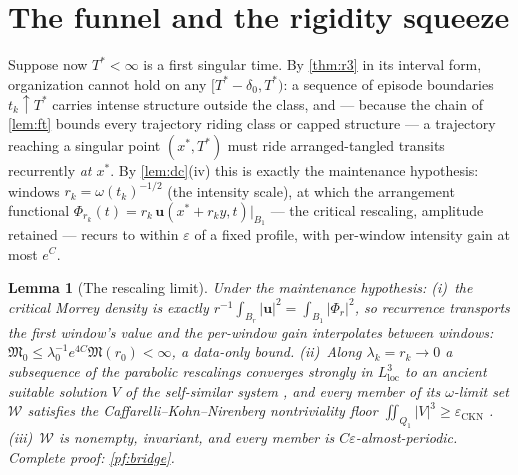 \documentclass[11pt,letterpaper]{amsart}
\newtheorem{lemma}[theorem]{Lemma}
\theoremstyle{definition}
\theoremstyle{remark}
\newcommand{\om}{\omega}
\newcommand{\uu}{\boldsymbol{u}}
\newcommand{\abs}[1]{\lvert #1 \rvert}
\begin{document}
\section{The funnel and the rigidity squeeze}\label{sec:funnel}

Suppose now $T^*<\infty$ is a first singular time. By \cref{thm:r3} in its interval
form, organization cannot hold on any $[T^*-\delta_0,T^*)$: a sequence of episode
boundaries $t_k\uparrow T^*$ carries intense structure outside the class, and ---
because the chain of \cref{lem:ft} bounds every trajectory riding class or capped
structure --- a trajectory reaching a singular point $(x^*,T^*)$ must ride
arranged-tangled transits recurrently \emph{at $x^*$}. By
\cref{lem:dc}\textup{(iv)} this is exactly the maintenance hypothesis: windows
$r_k=\om(t_k)^{-1/2}$ (the intensity scale), at which the arrangement functional
$\Phi_{r_k}(t)=r_k\,\uu(x^*+r_ky,t)|_{B_1}$ --- the critical rescaling, amplitude
retained --- recurs to within $\varepsilon$ of a fixed profile, with per-window
intensity gain at most $e^C$.

\begin{lemma}[The rescaling limit]\label{lem:bridge}
Under the maintenance hypothesis: \textup{(i)}~the critical Morrey density is exactly
$r^{-1}\int_{B_r}\abs{\uu}^2=\int_{B_1}\abs{\Phi_r}^2$, so recurrence transports the
first window's value and the per-window gain interpolates between windows:
$\mathfrak{M}_0\le\lambda_0^{-1}e^{4C}\mathfrak{M}(r_0)<\infty$, a data-only bound.
\textup{(ii)}~Along $\lambda_k=r_k\to0$ a subsequence of the parabolic rescalings
converges strongly in $L^3_{\mathrm{loc}}$ to an ancient suitable solution $V$ of the
self-similar system \cite{CKN1982,LemarieRieusset2002,KikuchiSeregin2007,Lin1998},
and every member of its $\om$-limit set $\mathcal{W}$ satisfies the
Caffarelli--Kohn--Nirenberg nontriviality floor
$\iint_{Q_1}\abs{V}^3\ge\varepsilon_{\mathrm{CKN}}$ \cite{CKN1982,Lin1998}.
\textup{(iii)}~$\mathcal{W}$ is nonempty, invariant, and every member is
$C\varepsilon$-almost-periodic. Complete proof: \cref{pf:bridge}.
\end{lemma}
\end{document}
